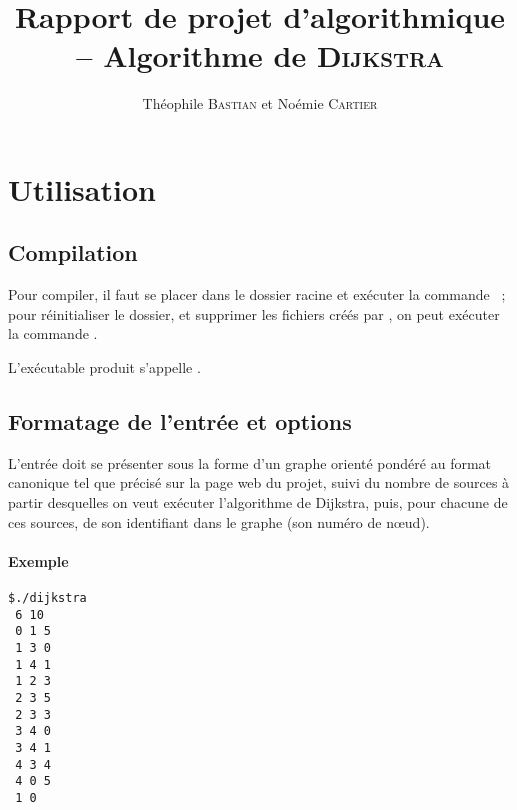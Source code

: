 \documentclass[12p0t,a4paper]{article}
\author{Théophile \textsc{Bastian} et Noémie \textsc{Cartier}}
\title{Rapport de projet d'algorithmique -- Algorithme de \textsc{Dijkstra}}
\begin{document}
\maketitle

\section{Utilisation}

\subsection{Compilation}

Pour compiler, il faut se placer dans le dossier racine et exécuter la commande ~; pour réinitialiser le dossier, et supprimer les fichiers créés par , on peut exécuter la commande .

L'exécutable produit s'appelle .

\subsection{Formatage de l'entrée et options}

L'entrée doit se présenter sous la forme d'un graphe orienté pondéré au format canonique tel que précisé sur la page web du projet, suivi du nombre de sources à partir desquelles on veut exécuter l'algorithme de Dijkstra, puis, pour chacune de ces sources, de son identifiant dans le graphe (son numéro de nœud).

\paragraph{Exemple}

\begin{lstlisting}
$./dijkstra
 6 10                                                                            
 0 1 5                                                                           
 1 3 0                                                                           
 1 4 1                                                                           
 1 2 3                                                                           
 2 3 5                                                                           
 2 3 3                                                                           
 3 4 0                                                                           
 3 4 1                                                                           
 4 3 4                                                                           
 4 0 5                                                                           
 1 0  
\end{lstlisting}
\end{document}
